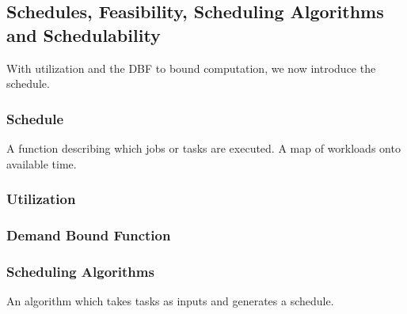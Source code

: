 \subsection{Schedules, Feasibility, Scheduling Algorithms and Schedulability}

With utilization and the DBF to bound computation, we now introduce the schedule.

\subsubsection{Schedule}

A function describing which jobs or tasks are executed.
A map of workloads onto available time.

\subsubsection{Utilization}

\subsubsection{Demand Bound Function}


\subsubsection{Scheduling Algorithms}

An algorithm which takes tasks as inputs and generates a schedule.


